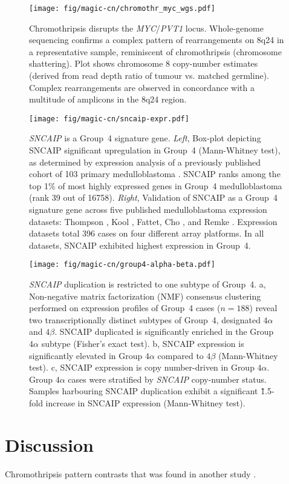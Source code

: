 \begin{figure}[b]
	\begin{center}
		\texttt{[image: fig/magic-cn/chromothr\_myc\_wgs.pdf]}
	\end{center}
	\caption[Chromothripsis disrupts the \emph{MYC}/\emph{PVT1} locus.]
	{
	Chromothripsis disrupts the \emph{MYC}/\emph{PVT1} locus.
	Whole-genome sequencing confirms a complex pattern of rearrangements on 8q24 in a representative sample, reminiscent of chromothripsis (chromosome shattering).
	Plot shows chromosome 8 copy-number estimates (derived from read depth ratio of tumour vs. matched germline).
	Complex rearrangements are observed in concordance with a multitude of amplicons in the 8q24 region.
	}
	\label{fig:chromothr_myc_wgs}
\end{figure}

\clearpage

\begin{figure}[t]
	\begin{center}
		\texttt{[image: fig/magic-cn/sncaip-expr.pdf]}
	\end{center}
	\caption[\emph{SNCAIP} is a Group~4 signature gene]
	{
	\emph{SNCAIP} is a Group~4 signature gene.
	\emph{Left}, Box-plot depicting SNCAIP significant upregulation in Group~4 (Mann-Whitney test), as determined by expression analysis of a previously published cohort of 103 primary medulloblastoma . SNCAIP ranks among the top 1\% of most highly expressed genes in Group~4 medulloblastoma (rank 39 out of 16758).
	\emph{Right}, Validation of SNCAIP as a Group~4 signature gene across five published medulloblastoma expression datasets: Thompson , Kool , Fattet, Cho , and Remke . Expression datasets total 396 cases on four different array platforms. In all datasets, SNCAIP exhibited highest expression in Group~4.
	}
	\label{fig:sncaip-expr}
\end{figure}

\begin{figure}[b]
	\begin{center}
		\texttt{[image: fig/magic-cn/group4-alpha-beta.pdf]}
	\end{center}
	\caption[\emph{SNCAIP} duplication is restricted to one subtype of Group~4]
	{
	\emph{SNCAIP} duplication is restricted to one subtype of Group~4.
	\textsf{a}, Non-negative matrix factorization (NMF) consensus clustering performed on expression profiles of Group~4 cases ($n = 188$) reveal two transcriptionally distinct subtypes of Group~4, designated $4\alpha$ and $4\beta$. SNCAIP duplicated is significantly enriched in the Group $4\alpha$ subtype (Fisher's exact test).
	\textsf{b}, SNCAIP expression is significantly elevated in Group $4\alpha$ compared to $4\beta$ (Mann-Whitney test).
	\textsf{c}, SNCAIP expression is copy number-driven in Group $4\alpha$. Group $4\alpha$ cases were stratified by \emph{SNCAIP} copy-number status. Samples harbouring SNCAIP duplication exhibit a significant \~1.5-fold increase in SNCAIP expression (Mann-Whitney test).
	}
	\label{fig:group4-alpha-beta}
\end{figure}

\clearpage

\section{Discussion}

Chromothripsis pattern contrasts that was found in another study .